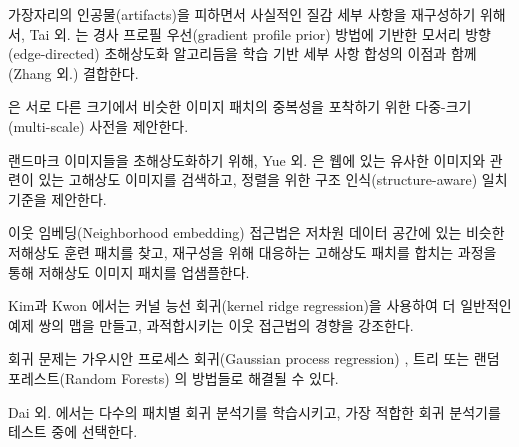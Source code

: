 \documentclass[10pt,twocolumn,letterpaper]{article}
\newcommand{\kor}[1]{#1}
\newcommand{\eng}[1]{}
\begin{document}
\eng{
To reconstruct realistic texture detail while avoiding edge artifacts, Tai et al. \cite{Tai2010} combine an edge-directed \ac{SR} algorithm based on a gradient profile prior \cite{Sun2008} with the benefits of learning-based detail synthesis. Zhang et al.
}\kor{
가장자리의 인공물(artifacts)을 피하면서 사실적인 질감 세부 사항을 재구성하기 위해서, Tai 외. \cite{Tai2010}는 경사 프로필 우선(gradient profile prior) \cite{Sun2008} 방법에 기반한 모서리 방향(edge-directed) \ac{초해상도화} 알고리듬을 학습 기반 세부 사항 합성의 이점과 함께 (Zhang 외.) 결합한다.
} \eng{
\cite{zhang2012multi} propose a multi-scale dictionary to capture redundancies of similar image patches at different scales.
}\kor{
\cite{zhang2012multi}은 서로 다른 크기에서 비슷한 이미지 패치의 중복성을 포착하기 위한 다중-크기(multi-scale) 사전을 제안한다.
} %
\eng{
To super-resolve landmark images, Yue et al. \cite{Yue2013} retrieve correlating \ac{HR} images with similar content from the web and propose a structure-aware matching criterion for alignment.
}\kor{
랜드마크 이미지들을 초해상도화하기 위해, Yue 외. \cite{Yue2013}은 웹에 있는 유사한 이미지와 관련이 있는 \ac{고해상도} 이미지를 검색하고, 정렬을 위한 구조 인식(structure-aware) 일치 기준을 제안한다.
}

\eng{
Neighborhood embedding approaches upsample a \ac{LR} image patch by finding similar \ac{LR} training patches in a low dimensional manifold and combining their corresponding \ac{HR} patches for reconstruction \cite{timofte2013anchored,timofte2014a+}.
}\kor{
이웃 임베딩(Neighborhood embedding) 접근법은 저차원 데이터 공간에 있는 비슷한 \ac{저해상도} 훈련 패치를 찾고, 재구성을 위해 대응하는 \ac{고해상도} 패치를 합치는 과정\cite{timofte2013anchored,timofte2014a+}을 통해 \ac{저해상도} 이미지 패치를 업샘플한다.
}
\eng{
In Kim and Kwon \cite{Kim10kernelregression} the authors emphasize the tendency of neighborhood approaches to overfit and formulate a more general map of example pairs using kernel ridge regression.
}\kor{
Kim과 Kwon \cite{Kim10kernelregression}에서는 커널 능선 회귀(kernel ridge regression)을 사용하여 더 일반적인 예제 쌍의 맵을 만들고, 과적합시키는 이웃 접근법의 경향을 강조한다.
}
\eng{
The regression problem can also be solved with Gaussian process regression \cite{he2011single}, trees \cite{salvador2015naive} or Random Forests \cite{schulter2015fast}.
}\kor{
회귀 문제는 가우시안 프로세스 회귀(Gaussian process regression) \cite{he2011single}, 트리 \cite{salvador2015naive} 또는 랜덤 포레스트(Random Forests) \cite{schulter2015fast}의 방법들로 해결될 수 있다.
}
\eng{
In Dai et al. \cite{dai2015jointly} a multitude of patch-specific regressors is learned and the most appropriate regressors selected during testing.
}\kor{
Dai 외. \cite{dai2015jointly}에서는 다수의 패치별 회귀 분석기를 학습시키고, 가장 적합한 회귀 분석기를 테스트 중에 선택한다.
} %
\end{document}
